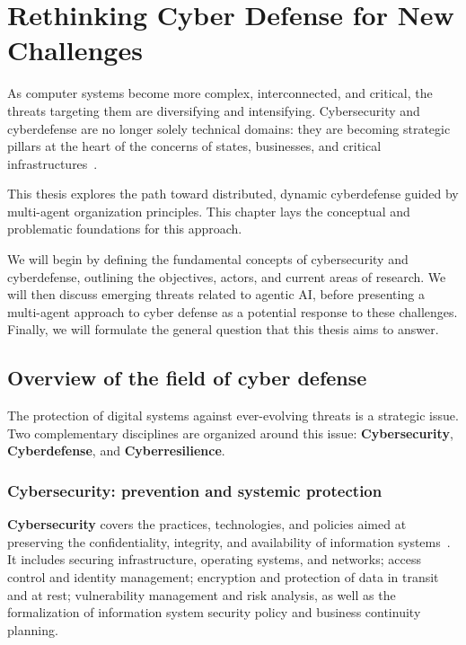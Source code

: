 \clearpage
\thispagestyle{empty}
\null
\newpage

\chapter{Rethinking Cyber Defense for New Challenges}

\noindent
As computer systems become more complex, interconnected, and critical, the threats targeting them are diversifying and intensifying. Cybersecurity and cyberdefense are no longer solely technical domains: they are becoming strategic pillars at the heart of the concerns of states, businesses, and critical infrastructures~\cite{ObiohaVal2025}.

This thesis explores the path toward distributed, dynamic cyberdefense guided by multi-agent organization principles. This chapter lays the conceptual and problematic foundations for this approach.

We will begin by defining the fundamental concepts of cybersecurity and cyberdefense, outlining the objectives, actors, and current areas of research. We will then discuss emerging threats related to agentic AI, before presenting a multi-agent approach to cyber defense as a potential response to these challenges. Finally, we will formulate the general question that this thesis aims to answer.

\section{Overview of the field of cyber defense}\label{sec:cyberdef-panorama}

The protection of digital systems against ever-evolving threats is a strategic issue. Two complementary disciplines are organized around this issue: \textbf{Cybersecurity}, \textbf{Cyberdefense}, and \textbf{Cyberresilience}.

\subsection*{Cybersecurity: prevention and systemic protection}

\textbf{Cybersecurity} covers the practices, technologies, and policies aimed at preserving the confidentiality, integrity, and availability of information systems~\cite{ANSSI2024}. It includes securing infrastructure, operating systems, and networks; access control and identity management; encryption and protection of data in transit and at rest; vulnerability management and risk analysis, as well as the formalization of information system security policy and business continuity planning.

